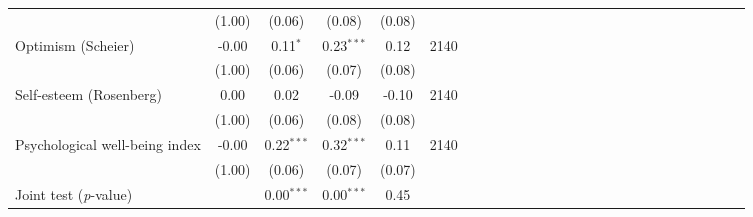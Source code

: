 {\begin{tabular}{l*{5}{SSSSc}}
          &   (1.00)&   (0.06)&   (0.08)&   (0.08)&         \\
Optimism (Scheier)&    -0.00&0.11$^{*}$&0.23$^{***}$&     0.12&     2140\\
          &   (1.00)&   (0.06)&   (0.07)&   (0.08)&         \\
Self-esteem (Rosenberg)&     0.00&     0.02&    -0.09&    -0.10&     2140\\
          &   (1.00)&   (0.06)&   (0.08)&   (0.08)&         \\
Psychological well-being index&    -0.00&0.22$^{***}$&0.32$^{***}$&     0.11&     2140\\
          &   (1.00)&   (0.06)&   (0.07)&   (0.07)&         \\
\midrule Joint test (\emph{p}-value)&         &{0.00$^{***}$}&{0.00$^{***}$}&   {0.45}&         \\
\bottomrule
\end{tabular}
}
